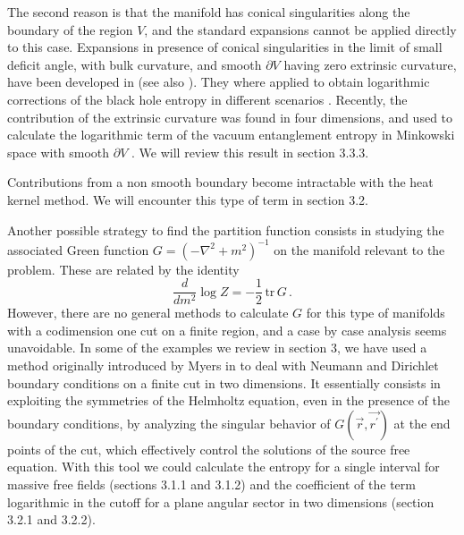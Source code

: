 \documentclass[a4paper]{article}
\begin{document}
The second reason is that the manifold has conical singularities along the boundary of the region $V$, and the standard expansions cannot be applied directly to this case. Expansions in presence of conical singularities in the limit of small deficit angle, with bulk curvature, and smooth $\partial V$ having zero extrinsic curvature, have been developed in \cite{dos} (see also \cite{dt}). They where applied to obtain logarithmic corrections of the black hole entropy in different scenarios  \cite{dos,cases}. Recently, the contribution of the extrinsic curvature was found in four dimensions, and used to calculate the logarithmic term of the vacuum entanglement entropy  in Minkowski space with smooth $\partial V$ \cite{una}. We will review this result in section 3.3.3.     

Contributions from a non smooth boundary become intractable with the heat kernel method. We will encounter this type of term in section 3.2. 

Another possible strategy to find the partition function consists in studying the associated Green function $G=(-\nabla^2+m^2)^{-1}$ on the manifold relevant to the problem. These are related by the identity
\begin{equation}
\frac{d}{dm^2}\log Z= -\frac{1}{2}\,\textrm{tr}  \, G\,.
\end{equation} 
 However, there are no general methods to calculate $G$ for this type of manifolds with a codimension one cut on a finite region, and a case by case analysis seems unavoidable. In some of the examples we review in section 3, we have used a method originally introduced by Myers in \cite{Myers} to deal with Neumann and Dirichlet boundary conditions on a finite cut in two dimensions. It essentially consists in exploiting the symmetries of the Helmholtz equation, even in the presence of the boundary conditions, by analyzing the singular behavior of $G(\vec r,\vec{r^{\prime}})$ at the end points of the cut, which effectively control the solutions of the source free equation. With this tool we could calculate the entropy for a single interval for massive free fields (sections 3.1.1 and 3.1.2) and the coefficient of the term logarithmic in the cutoff for a plane angular sector in two dimensions (section 3.2.1 and 3.2.2). 
\end{document}
